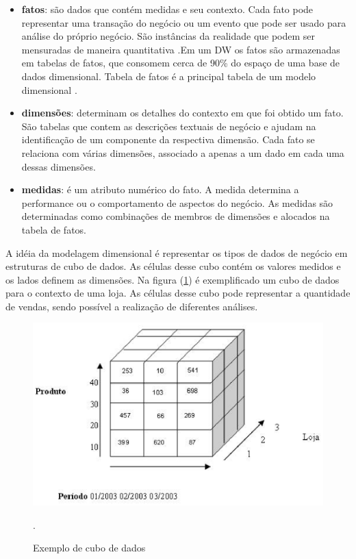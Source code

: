\begin{itemize}
	\item \textbf{fatos}: são dados que contém medidas e seu contexto. Cada fato pode representar uma transação do negócio ou um evento que pode ser usado para análise do próprio negócio. São instâncias da realidade  que podem ser mensuradas de maneira quantitativa \cite{kimball2002}.Em um DW os fatos são armazenadas em tabelas de fatos, que consomem cerca de 90\% do espaço de uma base de dados dimensional. Tabela de fatos é a principal tabela de um modelo dimensional \cite{kimball2002} \cite{ballard1998}.
	\item \textbf{dimensões}: determinam os detalhes do contexto em que foi obtido um fato. São tabelas que contem as descrições textuais de negócio e ajudam na identificação de um componente da respectiva dimensão. Cada fato se relaciona com várias dimensões, associado a apenas a um dado em cada uma dessas dimensões.
	\item \textbf{medidas}: é um atributo numérico do fato. A medida determina a performance ou o comportamento de aspectos do negócio. As medidas são determinadas como combinações de membros de dimensões e alocados na tabela de fatos.
\end{itemize}

%

A idéia da modelagem dimensional é representar os tipos de dados de negócio em estruturas de cubo de dados. As células desse cubo contém os valores medidos e os lados definem as dimensões. Na figura (\ref{dw-cube}) é exemplificado um cubo de dados para o contexto de uma loja. As células desse cubo pode representar a quantidade de vendas, sendo possível a realização de diferentes análises.

%


 \begin{figure}[!htb]
 	\centering
 		\includegraphics[scale=0.8]{figuras/dw-cubo}
 		\caption{Exemplo de cubo de dados}.
 		\label{dw-cube}
 \end{figure}

